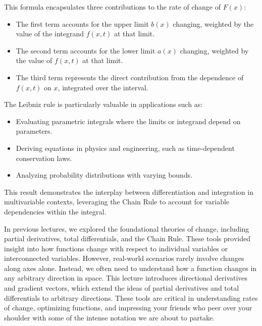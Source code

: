 \noindent This formula encapsulates three contributions to the rate of change of \( F(x) \):
\begin{itemize}
    \item The first term accounts for the upper limit \( b(x) \) changing, weighted by the value of the integrand \( f(x, t) \) at that limit.
    \item The second term accounts for the lower limit \( a(x) \) changing, weighted by the value of \( f(x, t) \) at that limit.
    \item The third term represents the direct contribution from the dependence of \( f(x, t) \) on \( x \), integrated over the interval.
\end{itemize}

\noindent The Leibniz rule is particularly valuable in applications such as:
\begin{itemize}
    \item Evaluating parametric integrals where the limits or integrand depend on parameters.
    \item Deriving equations in physics and engineering, such as time-dependent conservation laws.
    \item Analyzing probability distributions with varying bounds.
\end{itemize}

\noindent This result demonstrates the interplay between differentiation and integration in multivariable contexts, leveraging the Chain Rule to account for variable dependencies within the integral. 



\newpage

 

\noindent In previous lectures, we explored the foundational theories of change, including partial derivatives, total differentials, and the Chain Rule. These tools provided insight into how functions change with respect to individual variables or interconnected variables. However, real-world scenarios rarely involve changes along axes alone. Instead, we often need to understand how a function changes in any arbitrary direction in space. This lecture introduces directional derivatives and gradient vectors, which extend the ideas of partial derivatives and total differentials to arbitrary directions. These tools are critical in understanding rates of change, optimizing functions, and impressing your friends who peer over your shoulder with some of the intense notation we are about to partake.

